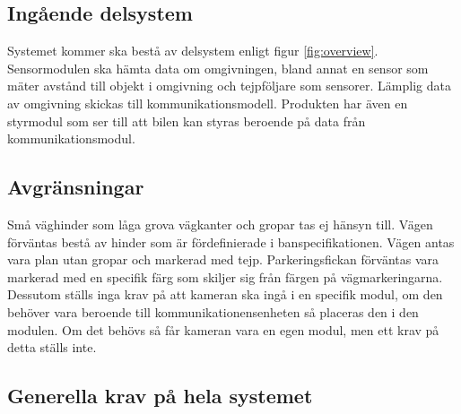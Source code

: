 \documentclass[kravspec/krav.tex]{subfiles}
\begin{document}
\subsection{Ingående delsystem}
Systemet kommer ska bestå av delsystem enligt figur
\ref{fig:overview}. Sensormodulen ska hämta data om omgivningen, bland annat en sensor som mäter avstånd
till objekt i omgivning och tejpföljare som sensorer. Lämplig data av omgivning
skickas till kommunikationsmodell. Produkten har även en styrmodul som ser till
att bilen kan styras beroende på data från kommunikationsmodul.

\subsection{Avgränsningar}
Små väghinder som låga grova vägkanter och gropar tas ej hänsyn till. Vägen förväntas bestå av hinder som är
fördefinierade i banspecifikationen. Vägen antas vara plan utan gropar och markerad med tejp. Parkeringsfickan
förväntas vara markerad med en specifik färg som skiljer sig från färgen på vägmarkeringarna. Dessutom
ställs inga krav på att kameran ska ingå i en specifik modul, om den behöver vara beroende till kommunikationensenheten så placeras den i den modulen. Om det behövs så får kameran vara en egen modul, men ett krav på detta ställs inte.


\subsection{Generella krav på hela systemet}
\end{document}
